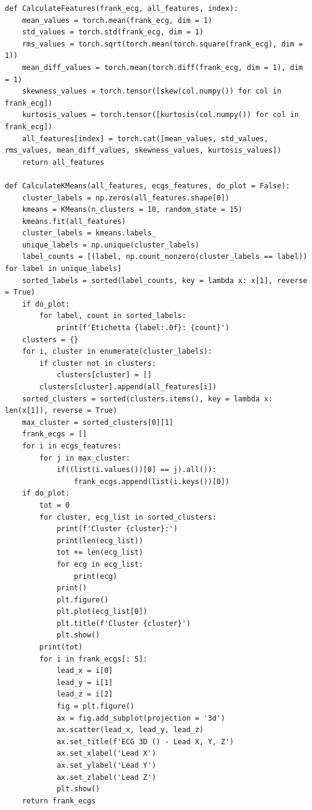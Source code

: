 \documentclass[12pt,italian]{report}
\begin{document}
\lstset{language=Python}
\begin{lstlisting}[aboveskip=15pt, belowskip=15pt, basicstyle=\fontsize{8}{10}\selectfont, keywordstyle=\color{blue}, breaklines=true, label=snippet:clustering]
def CalculateFeatures(frank_ecg, all_features, index):
    mean_values = torch.mean(frank_ecg, dim = 1)
    std_values = torch.std(frank_ecg, dim = 1)
    rms_values = torch.sqrt(torch.mean(torch.square(frank_ecg), dim = 1))
    mean_diff_values = torch.mean(torch.diff(frank_ecg, dim = 1), dim = 1)
    skewness_values = torch.tensor([skew(col.numpy()) for col in frank_ecg])
    kurtosis_values = torch.tensor([kurtosis(col.numpy()) for col in frank_ecg])
    all_features[index] = torch.cat([mean_values, std_values, rms_values, mean_diff_values, skewness_values, kurtosis_values])
    return all_features

def CalculateKMeans(all_features, ecgs_features, do_plot = False):
    cluster_labels = np.zeros(all_features.shape[0])
    kmeans = KMeans(n_clusters = 10, random_state = 15)
    kmeans.fit(all_features)
    cluster_labels = kmeans.labels_
    unique_labels = np.unique(cluster_labels)
    label_counts = [(label, np.count_nonzero(cluster_labels == label)) for label in unique_labels]
    sorted_labels = sorted(label_counts, key = lambda x: x[1], reverse = True)
    if do_plot:
        for label, count in sorted_labels:
            print(f'Etichetta {label:.0f}: {count}')
    clusters = {}
    for i, cluster in enumerate(cluster_labels):
        if cluster not in clusters:
            clusters[cluster] = []
        clusters[cluster].append(all_features[i])
    sorted_clusters = sorted(clusters.items(), key = lambda x: len(x[1]), reverse = True)
    max_cluster = sorted_clusters[0][1]
    frank_ecgs = []
    for i in ecgs_features:
        for j in max_cluster:
            if((list(i.values())[0] == j).all()):
                frank_ecgs.append(list(i.keys())[0])
    if do_plot:
        tot = 0
        for cluster, ecg_list in sorted_clusters:
            print(f'Cluster {cluster}:')
            print(len(ecg_list))
            tot += len(ecg_list)
            for ecg in ecg_list:
                print(ecg)
            print()
            plt.figure()
            plt.plot(ecg_list[0])
            plt.title(f'Cluster {cluster}')
            plt.show()
        print(tot)
        for i in frank_ecgs[: 5]:
            lead_x = i[0]
            lead_y = i[1]
            lead_z = i[2]
            fig = plt.figure()
            ax = fig.add_subplot(projection = '3d')
            ax.scatter(lead_x, lead_y, lead_z)
            ax.set_title(f'ECG 3D () - Lead X, Y, Z')
            ax.set_xlabel('Lead X')
            ax.set_ylabel('Lead Y')
            ax.set_zlabel('Lead Z')
            plt.show()
    return frank_ecgs
\end{lstlisting}
\end{document}
